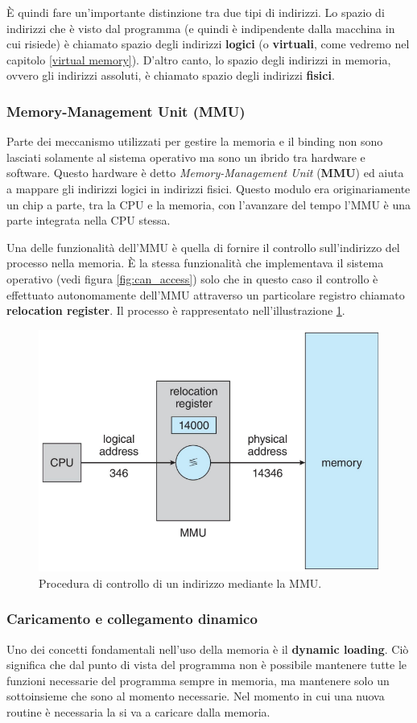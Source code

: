 È quindi fare un'importante distinzione tra due tipi di indirizzi. Lo spazio di indirizzi che è visto dal programma (e quindi è indipendente dalla macchina in cui risiede) è chiamato spazio degli indirizzi \textbf{logici} (o \textbf{virtuali}, come vedremo nel capitolo \ref{virtual memory}). D'altro canto, lo spazio degli indirizzi in memoria, ovvero gli indirizzi assoluti, è chiamato spazio degli indirizzi \textbf{fisici}. 

% 
\subsubsection{Memory-Management Unit (MMU)}
Parte dei meccanismo utilizzati per gestire la memoria e il binding non sono lasciati solamente al sistema operativo ma sono un ibrido tra hardware e software. Questo hardware è detto \textit{Memory-Management Unit} (\textbf{MMU}) ed aiuta a mappare gli indirizzi logici in indirizzi fisici. Questo modulo era originariamente un chip a parte, tra la CPU e la memoria, con l'avanzare del tempo l'MMU è una parte integrata nella CPU stessa.

Una delle funzionalità dell'MMU è quella di fornire il controllo sull'indirizzo del processo nella memoria. È la stessa funzionalità che implementava il sistema operativo (vedi figura \ref{fig:can_access}) solo che in questo caso il controllo è effettuato autonomamente dell'MMU attraverso un particolare registro chiamato \textbf{relocation register}. Il processo è rappresentato nell'illustrazione \ref{fig:can_access_MMU}.

\begin{figure}[h]
    \centering
    \includegraphics[width = .55\textwidth]{../res/imgs/main memory/can_access_MMU.png}
    \caption{Procedura di controllo di un indirizzo mediante la MMU.}
    \label{fig:can_access_MMU}
\end{figure}

% 
\subsubsection{Caricamento e collegamento dinamico}\label{dynamic loading and linking}
Uno dei concetti fondamentali nell'uso della memoria è il \textbf{dynamic loading}. Ciò significa che dal punto di vista del programma non è possibile mantenere tutte le funzioni necessarie del programma sempre in memoria, ma mantenere solo un sottoinsieme che sono al momento necessarie. Nel momento in cui una nuova routine è necessaria la si va a caricare dalla memoria.


